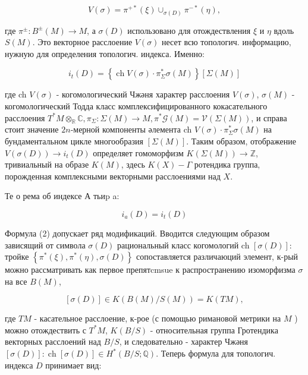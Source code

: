 \documentclass[10pt]{article}
\begin{document}
\[

V(\sigma)=\pi^{+*}(\xi) \cup_{\sigma(D)} \pi^{-*}(\eta),

\]



где $\pi^{ \pm}: B^{ \pm}(M) \rightarrow M$, а $\sigma(D)$ использовано для отождествления $\xi$ и $\eta$ вдоль $S(M)$. Это векторное расслоение $V(\sigma)$ несет всю топологич. информацию, нужную для определения топологич. индекса. Именно:



\[

i_{t}(D)=\left\{\operatorname{ch} V(\sigma) \cdot \pi_{\Sigma}^{*} \mathscr{\sigma}(M)\right\}[\Sigma(M)]

\]



где ch $V(\sigma)$ - когомологический Чжәня характер расслоения $V(\sigma)$, $\mathscr{\sigma}(M)$ - когомологический Тодда класс комплексифицированного кокасательного расслоения $T^{*} M \otimes_{\mathbb{R}} \mathbb{C}, \pi_{\Sigma}: \Sigma(M) \rightarrow M, \pi^{*} \mathscr{G}(M)=\mathscr{V}(\Sigma(M))$, и справа стоит значение $2 n$-мерной компоненты әлемента ch $V(\sigma) \cdot \pi_{\Sigma}^{*} \sigma(M)$ на бундаментальном цикле многообразия $[\Sigma(M)]$. Таким образом, отображение $V(\sigma(D)) \rightarrow i_{t}(D)$ определяет гомоморфизм $K(\Sigma(M)) \rightarrow \mathbb{Z}$, тривиальный на образе $K(M)$, здесь $K(X)-\Gamma$ ротендика группа, порожденная комплексными векторными расслоениями над $X$.



Те о рема об индексе А тьиp a:



\[

i_{a}(D)=i_{t}(D)

\]



Формула (2) допускает ряд модификаций. Вводится следующим образом зависящий от символа $\sigma(D)$ рациональный класс когомологий ch $[\sigma(D)]:$ тройке $\left\{\pi^{*}(\xi), \pi^{*}(\eta), \sigma(D)\right\}$ сопоставляется различаюций элемент, к-рый можно рассматривать как первое препятcmsue к распространению изоморфизма $\sigma$ на все $B(M)$,



\[

[\sigma(D)] \in K(B(M) / S(M))=K(T M),

\]



где $T M$ - касательное расслоение, к-рое (с помощью римановой метрики на $M$ ) можно отождествить с $T^{*} M$, $K(B / S)$ - относительная группа Гротендика векторных расслоений над $B / S$, и следовательно - характер Чжәня $[\sigma(D)]: \operatorname{ch}[\sigma(D)] \in H^{*}(B / S ; \mathbb{Q})$. Теперь формула для топологич. индекса $D$ принимает вид:
\end{document}
